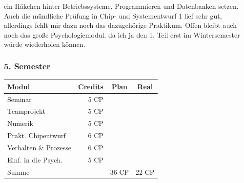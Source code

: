 \begin{multicols}{2}
ein Häkchen hinter Betriebssysteme, Programmieren und Datenbanken
setzen. Auch die mündliche Prüfung in Chip- und Systementwurf 1 lief
sehr gut, allerdings fehlt mir dazu noch das dazugehörige Praktikum. 
Offen bleibt  auch noch das
große Psychologiemodul, da ich ja den 1. Teil erst im Wintersemester
würde wiederholen können.
%

\subsubsection*{5. Semester}
{
\footnotesize
\begin{tabular}{|l|r|c|c|}
\hline \textbf{Modul}		& \textbf{Credits} 	& \textbf{Plan} & \textbf{Real} \\ 
\hline
\hline Seminar 				& 5 CP 				& \nx 			& 	 	\\ 
\hline Teamprojekt	 		& 5 CP 				& \nx 			& 		\\ 
\hline Numerik			 	& 5 CP 				& \nx 			& \nx 	\\ 
\hline Prakt. Chipentwurf	& 6 CP 				& \nx 			& \nx	\\ 
\hline Verhalten \& Prozesse\footnotemark[\value{footnote}]& 6 CP	& \nx 			& \nx	 	\\ 
\hline Einf. in die Psych. 	& 5 CP 				& \nx 			& \nx	\\ 
\hline
\hline Summe 				&  					& 36 CP 		& 22 CP \\ 
\hline 
\end{tabular}
}
\footnotetext[\value{footnote}]{Gesetzmäßigkeiten von Verhalten und mentalen Prozessen} 


\end{multicols}
